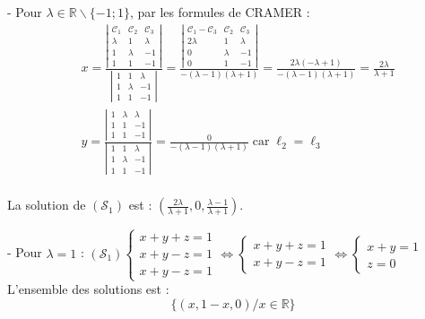 {{- Pour $\lambda \in \mathbb{R} \backslash\{-1 ; 1\}$, par les formules de CRAMER :
$$
\begin{aligned}
& x=\frac{\left|\begin{array}{ccc}
\mathcal{C}_1 & \mathcal{C}_2 & \mathcal{C}_3 \\
\lambda & 1 & \lambda \\
1 & \lambda & -1 \\
1 & 1 & -1
\end{array}\right|}{\left|\begin{array}{ccc}
1 & 1 & \lambda \\
1 & \lambda & -1 \\
1 & 1 & -1
\end{array}\right|}=\frac{\left|\begin{array}{ccc}
\mathcal{C}_1 - \mathcal{C}_3 & \mathcal{C}_2 & \mathcal{C}_3 \\
2\lambda & 1 & \lambda \\
0 & \lambda & -1 \\
0 & 1 & -1
\end{array}\right|}{-(\lambda-1)(\lambda+1)}=\frac{2 \lambda(-\lambda+1)}{-(\lambda-1)(\lambda+1)}=\frac{2 \lambda}{\lambda+1} \\
& y=\frac{\left|\begin{array}{ccc}
1 & \lambda & \lambda \\
1 & 1 & -1 \\
1 & 1 & -1
\end{array}\right|}{\left|\begin{array}{lll}
1 & 1 & \lambda \\
1 & \lambda & -1 \\
1 & 1 & -1
\end{array}\right|}=\frac{0}{-(\lambda-1)(\lambda+1)} \operatorname{car} \ell_2=\ell_3 \\
&
\end{aligned}
$$

La solution de $\left(\mathcal{S}_1\right)$ est : $\left(\frac{2 \lambda}{\lambda+1}, 0, \frac{\lambda-1}{\lambda+1}\right)$.

- Pour $\lambda=1$ :
$\left(\mathcal{S}_1\right)\left\{\begin{array}{l}x+y+z=1 \\ x+y-z=1 \\ x+y-z=1\end{array} \Leftrightarrow\left\{\begin{array}{l}x+y+z=1 \\ x+y-z=1\end{array} \Leftrightarrow\left\{\begin{array}{r}x+y=1 \\ z=0\end{array}\right.\right.\right.$
L'ensemble des solutions est :
$$
\{(x, 1-x, 0) / x \in \mathbb{R}\}
$$

}}
